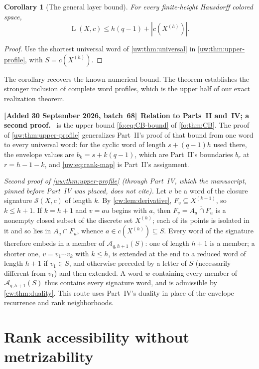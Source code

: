 \documentclass[11pt,letterpaper]{article}
\numberwithin{equation}{section}
\newtheorem{corollary}[corollary]{Corollary}
\theoremstyle{definition}
\theoremstyle{remark}
\theoremstyle{definition}
\newcommand{\A}{\mathcal A}
\newcommand{\layers}{\operatorname{L}}
\newenvironment{writenotee}[1][]{\par\smallskip\begingroup\small\sloppy
 \noindent\textbf{[Added 30 September 2026, batch~68]}\if\relax\detokenize{#1}\relax\else~\textbf{#1.}\fi\ }%
 {\par\endgroup\smallskip}
\newcommand{\cwcl}[1]{\overline{#1}}
\newcommand{\cwSig}{\mathcal S}
\begin{document}
\begin{corollary}[The general layer bound]\label{uw:cor:upper}
For every finite-height Hausdorff colored space,
\[
 \layers(X,c)\le h(q-1)+|c(X^{(h)})|.
\]
\end{corollary}
\begin{proof}
Use the shortest universal word of \cref{uw:thm:universal} in
\cref{uw:thm:upper-profile}, with $S=c(X^{(h)})$.
\end{proof}

The corollary recovers the known numerical bound. The theorem establishes
the stronger inclusion of complete word profiles, which is the upper half of
our exact realization theorem.

\begin{writenotee}[Relation to Parts~II and~IV; a second proof]
 is the upper bound \eqref{fo:eq:CB-bound} of
\cref{fo:thm:CB}. The proof of \cref{uw:thm:upper-profile} generalizes
Part~II's proof of that bound from one word to every universal word: for
the cyclic word of length $s+(q-1)h$ used there, the envelope values are
$b_k=s+k(q-1)$, which are Part~II's boundaries $b_r$ at $r=h-1-k$, and
\eqref{uw:eq:rank-map} is Part~II's assignment.

\emph{Second proof of \cref{uw:thm:upper-profile} (through Part~IV, which
the manuscript, pinned before Part~IV was placed, does not cite).} Let $v$
be a word of the closure signature $\cwSig(X,c)$ of length $k$. By
\cref{cw:lem:derivative}, $F_v\subseteq X^{(k-1)}$, so $k\le h+1$. If
$k=h+1$ and $v=au$ begins with $a$, then $F_v=\cwcl{A_a\cap F_u}$ is a
nonempty closed subset of the discrete set $X^{(h)}$; each of its points is
isolated in it and so lies in $A_a\cap F_u$, whence $a\in c(X^{(h)})\subseteq S$.
Every word of the signature therefore embeds in a member of $\A_{q,h+1}(S)$:
one of length $h+1$ is a member; a shorter one, $v=v_1\cdots v_k$ with
$k\le h$, is extended at the end to a reduced word of length $h+1$ if
$v_1\in S$, and otherwise preceded by a letter of $S$ (necessarily different
from $v_1$) and then extended. A word $w$ containing every member of
$\A_{q,h+1}(S)$ thus contains every signature word, and is admissible by
\cref{cw:thm:duality}. This route uses Part~IV's duality in place of the
envelope recurrence and rank neighborhoods.
\end{writenotee}

\section{Rank accessibility without metrizability}\label{uw:sec:accessibility}
\end{document}

